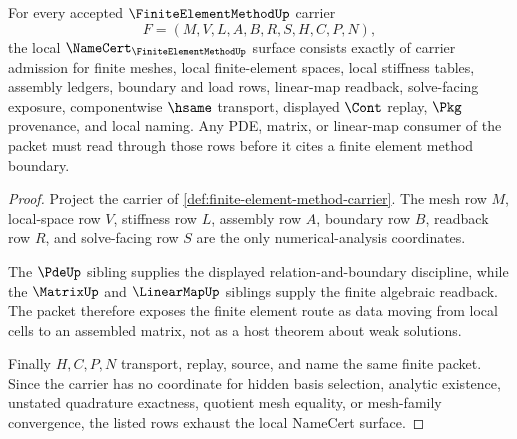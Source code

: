 \begin{theorem}
\label{thm:finite-element-method-namecert-obligations}
For every accepted $\FiniteElementMethodUp$ carrier
$$
F=(M,V,L,A,B,R,S,H,C,P,N),
$$
the local $\NameCert_{\FiniteElementMethodUp}$ surface consists exactly of carrier admission for finite meshes, local finite-element spaces, local stiffness tables, assembly ledgers, boundary and load rows, linear-map readback, solve-facing exposure, componentwise $\hsame$ transport, displayed $\Cont$ replay, $\Pkg$ provenance, and local naming. Any PDE, matrix, or linear-map consumer of the packet must read through those rows before it cites a finite element method boundary.
\end{theorem}
\begin{proof}
Project the carrier of \autoref{def:finite-element-method-carrier}. The mesh row $M$, local-space row $V$, stiffness row $L$, assembly row $A$, boundary row $B$, readback row $R$, and solve-facing row $S$ are the only numerical-analysis coordinates.

The $\PdeUp$ sibling supplies the displayed relation-and-boundary discipline, while the $\MatrixUp$ and $\LinearMapUp$ siblings supply the finite algebraic readback. The packet therefore exposes the finite element route as data moving from local cells to an assembled matrix, not as a host theorem about weak solutions.

Finally $H,C,P,N$ transport, replay, source, and name the same finite packet. Since the carrier has no coordinate for hidden basis selection, analytic existence, unstated quadrature exactness, quotient mesh equality, or mesh-family convergence, the listed rows exhaust the local NameCert surface.
\end{proof}

